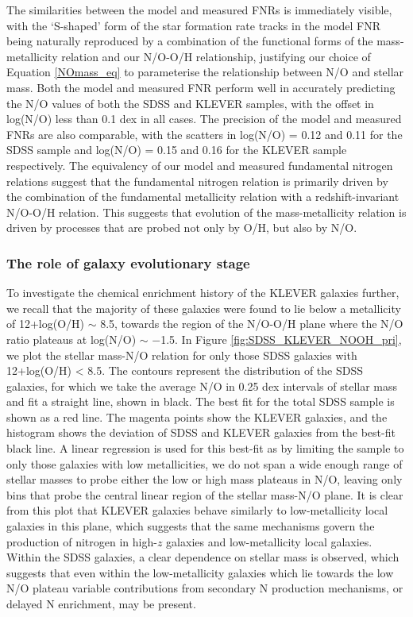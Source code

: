 \documentclass[usenatbib]{mnras} %
\begin{document}
The similarities between the model and measured FNRs is immediately visible, with the `S-shaped' form of the star formation rate tracks in the model FNR being naturally reproduced by a combination of the functional forms of the mass-metallicity relation and our N/O-O/H relationship, justifying our choice of Equation \ref{NOmass_eq} to parameterise the relationship between N/O and stellar mass. Both the model and measured FNR perform well in accurately predicting the N/O values of both the SDSS and KLEVER samples, with the offset in log(N/O) less than 0.1 dex in all cases. The precision of the model and measured FNRs are also comparable, with the scatters in log(N/O) = 0.12 and 0.11 for the SDSS sample and log(N/O) = 0.15 and 0.16 for the KLEVER sample respectively. The equivalency of our model and measured fundamental nitrogen relations suggest that the fundamental nitrogen relation is primarily driven by the combination of the fundamental metallicity relation with a redshift-invariant N/O-O/H relation. This suggests that evolution of the mass-metallicity relation is driven by processes that are probed not only by O/H, but also by N/O.  

\subsubsection{The role of galaxy evolutionary stage}

To investigate the chemical enrichment history of the KLEVER galaxies further, we recall that the majority of these galaxies were found to lie below a metallicity of 12+log(O/H) $\sim$ 8.5, towards the region of the N/O-O/H plane where the N/O ratio plateaus at log(N/O) $\sim$ $-$1.5. In Figure \ref{fig:SDSS_KLEVER_NOOH_pri}, we plot the stellar mass-N/O relation for only those SDSS galaxies with 12+log(O/H) < 8.5. The contours represent the distribution of the SDSS galaxies, for which we take the average N/O in 0.25 dex intervals of stellar mass and fit a straight line, shown in black. The best fit for the total SDSS sample is shown as a red line. The magenta points show the KLEVER galaxies, and the histogram shows the deviation of SDSS and KLEVER galaxies from the best-fit black line. A linear regression is used for this best-fit as by limiting the sample to only those galaxies with low metallicities, we do not span a wide enough range of stellar masses to probe either the low or high mass plateaus in N/O, leaving only bins that probe the central linear region of the stellar mass-N/O plane. It is clear from this plot that KLEVER galaxies behave similarly to low-metallicity local galaxies in this plane, which suggests that the same mechanisms govern the production of nitrogen in high-$z$ galaxies and low-metallicity local galaxies. Within the SDSS galaxies, a clear dependence on stellar mass is observed, which suggests that even within the low-metallicity galaxies which lie towards the low N/O plateau variable contributions from secondary N production mechanisms, or delayed N enrichment, may be present. 
\end{document}
